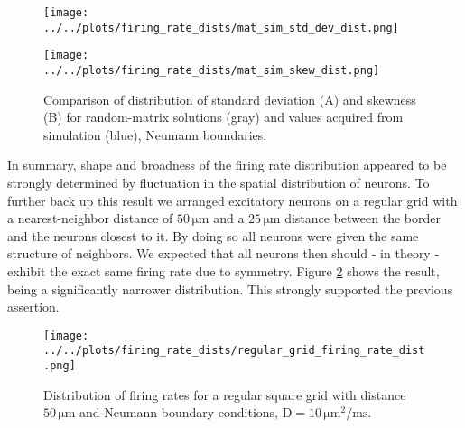 \documentclass[10pt,a4paper]{article}
\begin{document}
\begin{figure}
\begin{minipage}{0.5\textwidth}
\texttt{[image: ../../plots/firing\_rate\_dists/mat\_sim\_std\_dev\_dist.png]}
\end{minipage}
\begin{minipage}{0.5\textwidth}
\texttt{[image: ../../plots/firing\_rate\_dists/mat\_sim\_skew\_dist.png]}
\end{minipage}
\caption{Comparison of distribution of standard deviation (A) and skewness (B) for random-matrix solutions (gray) and values acquired from simulation (blue), Neumann boundaries.}
\label{Std_Skew_Dist_vs_Data}
\end{figure}
In summary, shape and broadness of the firing rate distribution appeared to be strongly determined by fluctuation in the spatial distribution of neurons. To further back up this result we arranged excitatory neurons on a regular grid with a nearest-neighbor distance of $\mathrm{50\, \mu m}$ and a $\mathrm{25\, \mu m}$ distance between the border and the neurons closest to it. By doing so all neurons were given the same structure of neighbors. We expected that all neurons then should - in theory - exhibit the exact same firing rate due to symmetry. Figure \ref{Fir_Rate_Dist_Reg_Grid} shows the result, being a significantly narrower distribution. This strongly supported the previous assertion.
\begin{figure}
\begin{center}
\texttt{[image: ../../plots/firing\_rate\_dists/regular\_grid\_firing\_rate\_dist.png]}
\end{center}
\caption{Distribution of firing rates for a regular square grid with distance $\mathrm{50\, \mu m}$ and Neumann boundary conditions, $\mathrm{D=10\,\mu m^2/ms}$.}
\label{Fir_Rate_Dist_Reg_Grid}
\end{figure}  
\end{document}

